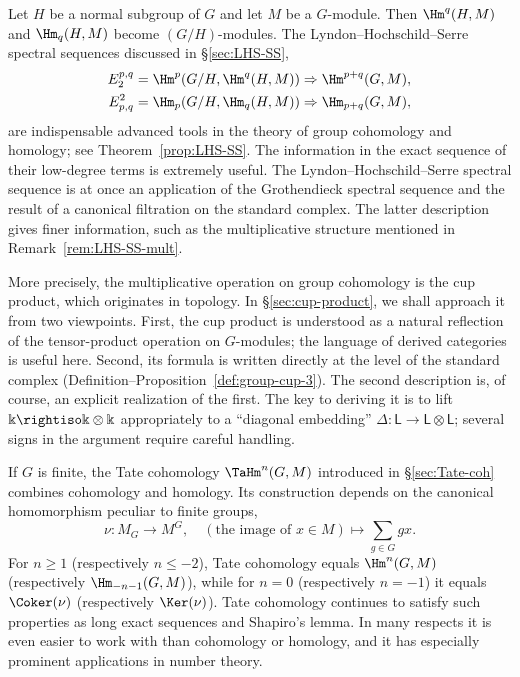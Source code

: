 Let $H$ be a normal subgroup of $G$ and let $M$ be a $G$-module. Then
$\Hm^q(H,M)$ and $\Hm_q(H,M)$ become $(G/H)$-modules. The
Lyndon--Hochschild--Serre spectral sequences discussed in \S\ref{sec:LHS-SS},
\begin{align*}
	E_2^{p, q} = \Hm^p(G/H, \Hm^q(H, M)) & \Rightarrow \Hm^{p+q}(G, M), \\
	E^2_{p, q} = \Hm_p(G/H, \Hm_q(H, M)) & \Rightarrow \Hm_{p+q}(G, M),
\end{align*}
are indispensable advanced tools in the theory of group cohomology and
homology; see Theorem~\ref{prop:LHS-SS}. The information in the exact sequence
of their low-degree terms is extremely useful. The
Lyndon--Hochschild--Serre spectral sequence is at once an application of the
Grothendieck spectral sequence and the result of a canonical filtration on the
standard complex. The latter description gives finer information, such as the
multiplicative structure mentioned in Remark~\ref{rem:LHS-SS-mult}.

More precisely, the multiplicative operation on group cohomology is the cup
product, which originates in topology. In \S\ref{sec:cup-product}, we shall
approach it from two viewpoints. First, the cup product is understood as a
natural reflection of the tensor-product operation on $G$-modules; the
language of derived categories is useful here. Second, its formula is written
directly at the level of the standard complex
(Definition--Proposition~\ref{def:group-cup-3}). The second description is, of
course, an explicit realization of the first. The key to deriving it is to
lift $\Bbbk\rightiso\Bbbk\otimes\Bbbk$ appropriately to a ``diagonal
embedding'' $\Delta:\mathsf{L}\to\mathsf{L}\otimes\mathsf{L}$; several signs
in the argument require careful handling.

If $G$ is finite, the Tate cohomology $\TaHm^n(G,M)$ introduced in
\S\ref{sec:Tate-coh} combines cohomology and homology. Its construction
depends on the canonical homomorphism peculiar to finite groups,
\[ \nu: M_G \to M^G, \quad (\text{the image of }x \in M) \mapsto \sum_{g \in G} gx. \]
For $n\geq1$ (respectively $n\leq-2$), Tate cohomology equals $\Hm^n(G,M)$
(respectively $\Hm_{-n-1}(G,M)$), while for $n=0$ (respectively $n=-1$) it
equals $\Coker(\nu)$ (respectively $\Ker(\nu)$). Tate cohomology continues to
satisfy such properties as long exact sequences and Shapiro's lemma. In many
respects it is even easier to work with than cohomology or homology, and it has
especially prominent applications in number theory.


